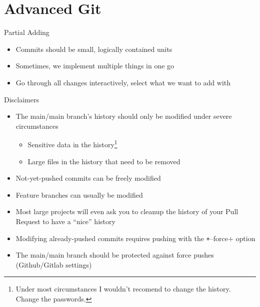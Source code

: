 \section{Advanced Git}

\begin{frame}[c, fragile]{Partial Adding}
  \begin{itemize}
    \item Commits should be small, logically contained units
    \item Sometimes, we implement multiple things in one go 
    \item Go through all changes interactively, select what we want to add with
  \end{itemize}
\end{frame}

%

\begin{frame}[c]{Disclaimers}
  \begin{itemize}
    \item The main/main branch's history should only be modified under severe circumstances\\
      \begin{itemize}
        \item Sensitive data in the history\footnote{Under most circumstances I wouldn't recomend to change the history. Change the passwords.}
        \item Large files in the history that need to be removed
      \end{itemize}
    \item Not-yet-pushed commits can be freely modified
    \item Feature branches can usually be modified
    \item Most large projects will even ask you to cleanup the history of your Pull Request to have a \enquote{nice} history
    \item Modifying already-pushed commits requires pushing with the \texttt+--force+ option
    \item The main/main branch should be protected against force pushes\\
      (Github/Gitlab settings)
  \end{itemize}
\end{frame}

